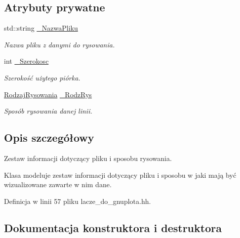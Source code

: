 \subsection*{Atrybuty prywatne}
\begin{DoxyCompactItemize}
\item 
std\+::string \hyperlink{class_pz_g_1_1_info_pliku_do_rysowania_a07ab06c56b9c3179e566a4123ab2a037}{\+\_\+\+Nazwa\+Pliku}
\begin{DoxyCompactList}\small\item\em Nazwa pliku z danymi do rysowania. \end{DoxyCompactList}\item 
int \hyperlink{class_pz_g_1_1_info_pliku_do_rysowania_a56a03dde7a7a414dbf3c230812a8d741}{\+\_\+\+Szerokosc}
\begin{DoxyCompactList}\small\item\em Szerokość użytego piórka. \end{DoxyCompactList}\item 
\hyperlink{namespace_pz_g_a705c92106f39b7d0c34a6739d10ff0b6}{Rodzaj\+Rysowania} \hyperlink{class_pz_g_1_1_info_pliku_do_rysowania_ac2512f2073c66164beb2e88db31344a4}{\+\_\+\+Rodz\+Rys}
\begin{DoxyCompactList}\small\item\em Sposób rysowania danej linii. \end{DoxyCompactList}\end{DoxyCompactItemize}


\subsection{Opis szczegółowy}
Zestaw informacji dotyczący pliku i sposobu rysowania. 

Klasa modeluje zestaw informacji dotyczący pliku i sposobu w jaki mają być wizualizowane zawarte w nim dane. 

Definicja w linii 57 pliku lacze\+\_\+do\+\_\+gnuplota.\+hh.



\subsection{Dokumentacja konstruktora i destruktora}
\mbox{\label{class_pz_g_1_1_info_pliku_do_rysowania_a48bc8ad94ef5fd5120b668a566c9172e}} 
